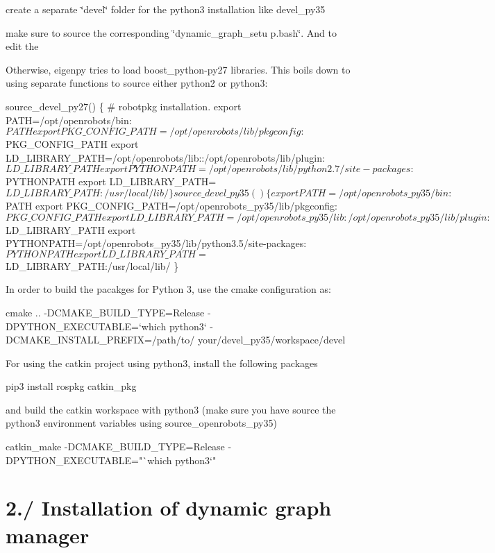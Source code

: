 \begin{DoxyItemize}
\item create a separate \char`\"{}devel\char`\"{} folder for the python3 installation like devel\+\_\+py35
\item make sure to source the corresponding \char`\"{}dynamic\+\_\+graph\+\_\+setu
p.\+bash\char`\"{}. And to edit the 
 Otherwise, eigenpy tries to load boost\+\_\+python-\/py27 libraries. This boils down to using separate functions to source either python2 or python3\+: 
\begin{DoxyCode}
source\_devel\_py27() \{
\textcolor{preprocessor}{  # robotpkg installation.}
  export PATH=/opt/openrobots/bin:$PATH
  export PKG\_CONFIG\_PATH=/opt/openrobots/lib/pkgconfig:$PKG\_CONFIG\_PATH
  export LD\_LIBRARY\_PATH=/opt/openrobots/lib::/opt/openrobots/lib/plugin:$LD\_LIBRARY\_PATH
  export PYTHONPATH=/opt/openrobots/lib/python2.7/site-packages:$PYTHONPATH
  export LD\_LIBRARY\_PATH=$LD\_LIBRARY\_PATH:/usr/local/lib/
\}
source\_devel\_py35() \{
  export PATH=/opt/openrobots\_py35/bin:$PATH
  export PKG\_CONFIG\_PATH=/opt/openrobots\_py35/lib/pkgconfig:$PKG\_CONFIG\_PATH
  export LD\_LIBRARY\_PATH=/opt/openrobots\_py35/lib:/opt/openrobots\_py35/lib/plugin:$LD\_LIBRARY\_PATH
  export PYTHONPATH=/opt/openrobots\_py35/lib/python3.5/site-packages:$PYTHONPATH
  export LD\_LIBRARY\_PATH=$LD\_LIBRARY\_PATH:/usr/local/lib/
\}
\end{DoxyCode}
 In order to build the pacakges for Python 3, use the cmake configuration as\+: 
\begin{DoxyCode}
cmake .. -DCMAKE\_BUILD\_TYPE=Release -DPYTHON\_EXECUTABLE=`which python3` -DCMAKE\_INSTALL\_PREFIX=/path/to/
      your/devel\_py35/workspace/devel
\end{DoxyCode}
 For using the catkin project using python3, install the following packages 
\begin{DoxyCode}
pip3 install rospkg catkin\_pkg
\end{DoxyCode}
 and build the catkin workspace with python3 (make sure you have source the python3 environment variables using source\+\_\+openrobots\+\_\+py35) 
\begin{DoxyCode}
catkin\_make -DCMAKE\_BUILD\_TYPE=Release -DPYTHON\_EXECUTABLE=\textcolor{stringliteral}{"`which python3`"}
\end{DoxyCode}

\end{DoxyItemize}\hypertarget{subpage_installation_install_sec_dgm}{}\section{2./ Installation of dynamic graph manager}\label{subpage_installation_install_sec_dgm}

